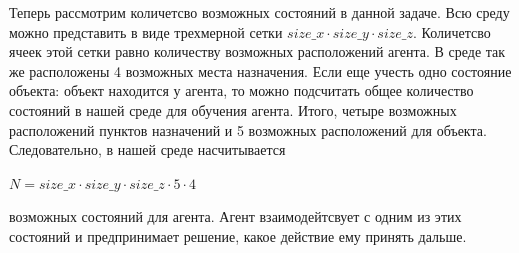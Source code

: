 \documentclass[a4paper]{report}
\theoremstyle{definition}
\theoremstyle{plain}
\theoremstyle{remark}
\theoremstyle{remark}
\theoremstyle{definition}
\begin{document}
Теперь рассмотрим количетсво возможных состояний в данной задаче. Всю среду можно представить в виде трехмерной сетки $size\_x \cdot size\_y \cdot size\_z$. Количетсво ячеек этой сетки равно количеству возможных расположений агента. В среде так же расположены 4 возможных места назначения. Если еще учесть одно состояние объекта: объект находится у агента, то можно подсчитать общее количество состояний в нашей среде для обучения агента. Итого, четыре возможных расположений пунктов назначений и 5 возможных расположений для объекта. Следовательно, в нашей среде насчитывается 
\begin{center}
    $N = size\_x \cdot size\_y \cdot size\_z \cdot 5 \cdot 4$
\end{center}
возможных состояний для агента. Агент взаимодейтсвует с одним из этих состояний и предпринимает решение, какое действие ему принять дальше.\\
\end{document}

